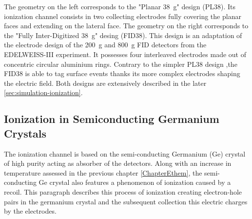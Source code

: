 The geometry on the left corresponds to the "Planar \SI{38}{\g}" design (PL38). Its ionization channel consists in two collecting electrodes fully covering the planar faces and extending on the lateral face.
The geometry on the right corresponds to the "Fully Inter-Digitized \SI{38}{\g}" desing (FID38). This design is an adaptation of the electrode design of the \SI{200}{\g} and \SI{800}{\g} FID detectors from the EDELWEISS-III experiment. It possesses four interleaved electrodes made out of concentric circular aluminium rings. Contrary to the simpler PL38 design ,the FID38 is able to tag surface events thanks its more complex electrodes shaping the electric field. Both designs are extensively described in the later \ref{sec:simulation-ionization}.


\subsection{Ionization in Semiconducting Germanium Crystals}
\label{par:ionization-process}



The ionization channel is based on the semi-conducting Germanium (Ge) crystal of high purity acting as absorber of the detectors. Along with an increase in temperature assessed in the previous chapter \ref{ChapterEthem}, the semi-conducting Ge crystal also features a phenomenon of ionization caused by a recoil. This paragraph describes this process of ionization creating electron-hole pairs in the germanium crystal and the subsequent collection this electric charges by the electrodes.

